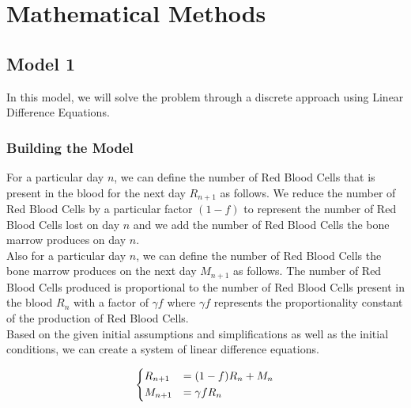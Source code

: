 \section{Mathematical Methods}
\label{sec:mathematical-methods}

\subsection{Model 1}
\label{subsec:model-1}

In this model, we will solve the problem through a discrete approach using Linear Difference Equations.

\subsubsection{Building the Model}

For a particular day $n$, we can define the number of Red Blood Cells that is present in the blood for the next day $R_{n+1}$ as follows. We reduce the number of Red Blood Cells by a particular factor $(1-f)$ to represent the number of Red Blood Cells lost on day $n$ and we add the number of Red Blood Cells the bone marrow produces on day $n$.\\

Also for a particular day $n$, we can define the number of Red Blood Cells the bone marrow produces on the next day $M_{n+1}$ as follows. The number of Red Blood Cells produced is proportional to the number of Red Blood Cells present in the blood $R_n$ with a factor of $\gamma f$ where $\gamma f$ represents the proportionality constant of the production of Red Blood Cells.\\

Based on the given initial assumptions and simplifications as well as the initial conditions, we can create a system of linear difference equations.

\begin{equation}
    \begin{dcases}
        R_{n+1} &= (1-f)R_n + M_n\\
        M_{n+1} &= \gamma fR_n
    \end{dcases}
    \label{eq:linear-difference-model-system}
\end{equation}

